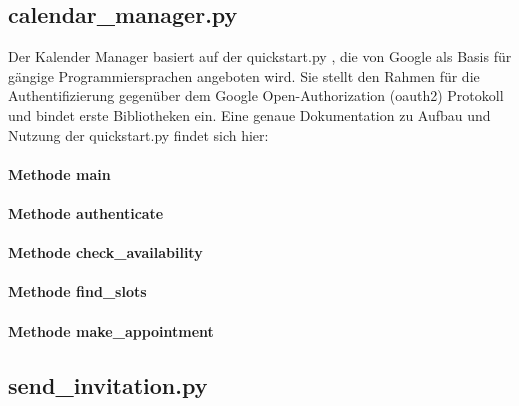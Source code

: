         \subsection{calendar\_manager.py}
            Der Kalender Manager basiert auf der quickstart.py \cite{pythonQuickstart}, die von Google als Basis für gängige Programmiersprachen angeboten wird. Sie stellt den Rahmen für die Authentifizierung gegenüber dem Google Open-Authorization (oauth2) Protokoll und bindet erste Bibliotheken ein. Eine genaue Dokumentation zu Aufbau und Nutzung der quickstart.py findet sich hier: 

            \paragraph{Methode main}

            
            \paragraph{Methode authenticate}
      

            \paragraph{Methode check\_availability}


            \paragraph{Methode find\_slots}


            \paragraph{Methode make\_appointment}


            

        
        \subsection{send\_invitation.py}
        
        
        
        
        \subsection{}



